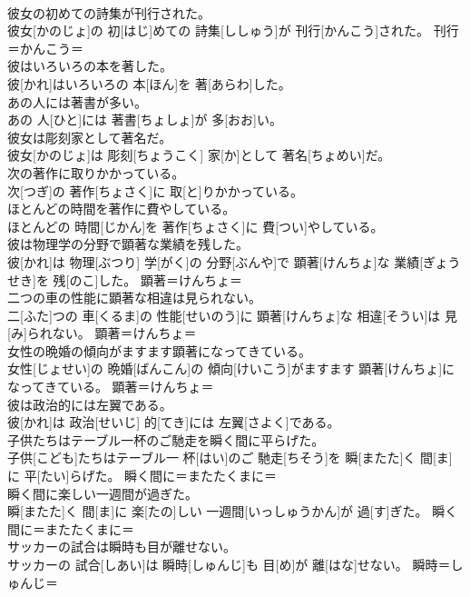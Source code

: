 \documentclass[8pt]{extreport}
\begin{document}
\begin{CJK}{UTF8}{min}
{\\	彼女の初めての詩集が刊行された。	
\\	彼女[かのじょ]の 初[はじ]めての 詩集[ししゅう]が 刊行[かんこう]された。	刊行＝かんこう＝ 
\\	彼はいろいろの本を著した。	
\\	彼[かれ]はいろいろの 本[ほん]を 著[あらわ]した。	
\\	あの人には著書が多い。	
\\	あの 人[ひと]には 著書[ちょしょ]が 多[おお]い。	
\\	彼女は彫刻家として著名だ。	
\\	彼女[かのじょ]は 彫刻[ちょうこく] 家[か]として 著名[ちょめい]だ。	
\\	次の著作に取りかかっている。	
\\	次[つぎ]の 著作[ちょさく]に 取[と]りかかっている。	
\\	ほとんどの時間を著作に費やしている。	
\\	ほとんどの 時間[じかん]を 著作[ちょさく]に 費[つい]やしている。	
\\	彼は物理学の分野で顕著な業績を残した。	
\\	彼[かれ]は 物理[ぶつり] 学[がく]の 分野[ぶんや]で 顕著[けんちょ]な 業績[ぎょうせき]を 残[のこ]した。	顕著＝けんちょ＝ 
\\	二つの車の性能に顕著な相違は見られない。	
\\	二[ふた]つの 車[くるま]の 性能[せいのう]に 顕著[けんちょ]な 相違[そうい]は 見[み]られない。	顕著＝けんちょ＝ 
\\	女性の晩婚の傾向がますます顕著になってきている。	
\\	女性[じょせい]の 晩婚[ばんこん]の 傾向[けいこう]がますます 顕著[けんちょ]になってきている。	顕著＝けんちょ＝ 
\\	彼は政治的には左翼である。	
\\	彼[かれ]は 政治[せいじ] 的[てき]には 左翼[さよく]である。	
\\	子供たちはテーブル一杯のご馳走を瞬く間に平らげた。	
\\	子供[こども]たちはテーブル一 杯[はい]のご 馳走[ちそう]を 瞬[またた]く 間[ま]に 平[たい]らげた。	瞬く間に＝またたくまに＝ 
\\	瞬く間に楽しい一週間が過ぎた。	
\\	瞬[またた]く 間[ま]に 楽[たの]しい 一週間[いっしゅうかん]が 過[す]ぎた。	瞬く間に＝またたくまに＝ 
\\	サッカーの試合は瞬時も目が離せない。	
\\	サッカーの 試合[しあい]は 瞬時[しゅんじ]も 目[め]が 離[はな]せない。	瞬時＝しゅんじ＝ 
}
\end{CJK}
\end{document}
